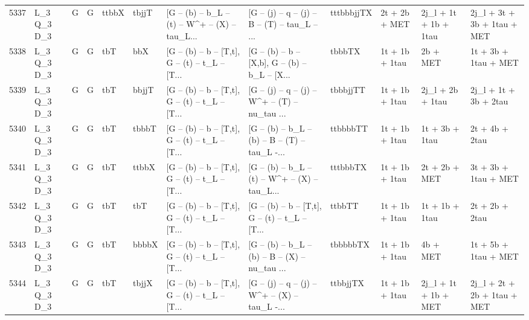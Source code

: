 \begin{tabular}{llllllllllll}
5337 &  L\_3 Q\_3 D\_3 &     G &     G &       ttbbX &       tbjjT &  [G -- (b) -- b\_L -- (t) -- W\textasciicircum + -- (X) -- tau\_L... &  [G -- (j) -- q -- (j) -- B -- (T) -- tau\_L -- ... &  tttbbbjjTX &            2t + 2b + MET &    2j\_l + 1t + 1b + 1tau &        2j\_l + 3t + 3b + 1tau + MET \\
5338 &  L\_3 Q\_3 D\_3 &     G &     G &         tbT &         bbX &  [G -- (b) -- b -- [T,t], G -- (t) -- t\_L -- [T... &  [G -- (b) -- b -- [X,b], G -- (b) -- b\_L -- [X... &      tbbbTX &           1t + 1b + 1tau &                 2b + MET &               1t + 3b + 1tau + MET \\
5339 &  L\_3 Q\_3 D\_3 &     G &     G &         tbT &       bbjjT &  [G -- (b) -- b -- [T,t], G -- (t) -- t\_L -- [T... &  [G -- (j) -- q -- (j) -- W\textasciicircum + -- (T) -- nu\_tau ... &    tbbbjjTT &           1t + 1b + 1tau &         2j\_l + 2b + 1tau &              2j\_l + 1t + 3b + 2tau \\
5340 &  L\_3 Q\_3 D\_3 &     G &     G &         tbT &       tbbbT &  [G -- (b) -- b -- [T,t], G -- (t) -- t\_L -- [T... &  [G -- (b) -- b\_L -- (b) -- B -- (T) -- tau\_L -... &    ttbbbbTT &           1t + 1b + 1tau &           1t + 3b + 1tau &                     2t + 4b + 2tau \\
5341 &  L\_3 Q\_3 D\_3 &     G &     G &         tbT &       ttbbX &  [G -- (b) -- b -- [T,t], G -- (t) -- t\_L -- [T... &  [G -- (b) -- b\_L -- (t) -- W\textasciicircum + -- (X) -- tau\_L... &    tttbbbTX &           1t + 1b + 1tau &            2t + 2b + MET &               3t + 3b + 1tau + MET \\
5342 &  L\_3 Q\_3 D\_3 &     G &     G &         tbT &         tbT &  [G -- (b) -- b -- [T,t], G -- (t) -- t\_L -- [T... &  [G -- (b) -- b -- [T,t], G -- (t) -- t\_L -- [T... &      ttbbTT &           1t + 1b + 1tau &           1t + 1b + 1tau &                     2t + 2b + 2tau \\
5343 &  L\_3 Q\_3 D\_3 &     G &     G &         tbT &       bbbbX &  [G -- (b) -- b -- [T,t], G -- (t) -- t\_L -- [T... &  [G -- (b) -- b\_L -- (b) -- B -- (X) -- nu\_tau ... &    tbbbbbTX &           1t + 1b + 1tau &                 4b + MET &               1t + 5b + 1tau + MET \\
5344 &  L\_3 Q\_3 D\_3 &     G &     G &         tbT &       tbjjX &  [G -- (b) -- b -- [T,t], G -- (t) -- t\_L -- [T... &  [G -- (j) -- q -- (j) -- W\textasciicircum + -- (X) -- tau\_L -... &    ttbbjjTX &           1t + 1b + 1tau &     2j\_l + 1t + 1b + MET &        2j\_l + 2t + 2b + 1tau + MET \\

\end{tabular}
